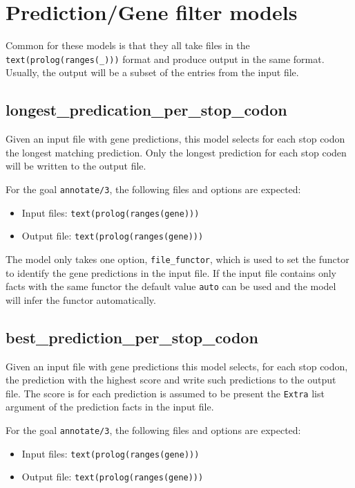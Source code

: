 \documentclass{book}
\begin{document}
\section{Prediction/Gene filter models}

Common for these models is that they all take files in the
\texttt{text(prolog(ranges(\_)))} format and produce output in 
the same format. Usually, the output will be a subset of the entries
from the input file.

\subsection{longest\_predication\_per\_stop\_codon}

Given an input file with gene predictions, this model selects for each
stop codon the longest matching prediction. Only the longest
prediction for each stop coden will be written to the output file.

For the goal \texttt{annotate/3}, the following files
and options are expected:
\begin{itemize}
\item Input files: \texttt{text(prolog(ranges(gene)))}
\item Output file: \texttt{text(prolog(ranges(gene)))}
\end{itemize}

The model only takes one option, \texttt{file\_functor}, which is 
used to set the functor to identify the gene predictions in the input
file. If the input file contains only facts with the same functor the 
default value \texttt{auto} can be used and the model will infer the 
functor automatically.

\subsection{best\_prediction\_per\_stop\_codon}

Given an input file with gene predictions this model selects, for each
stop codon, the prediction with the highest score and write such
predictions to the output file. The score is for each prediction is
assumed to be present the \texttt{Extra} list argument of the
prediction facts in the input file. 

For the goal \texttt{annotate/3}, the following files
and options are expected:
\begin{itemize}
\item Input files: \texttt{text(prolog(ranges(gene)))}
\item Output file: \texttt{text(prolog(ranges(gene)))}
\end{itemize}
\end{document}
